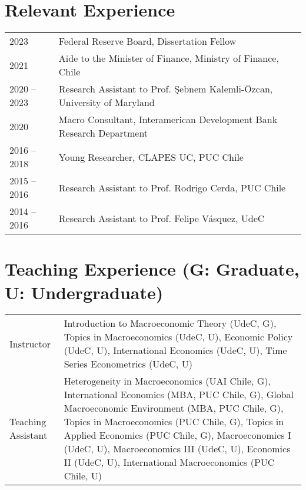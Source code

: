 \documentclass[10pt]{article}
\begin{document}



\section*{Relevant Experience}

\begin{tabular}{@{}p{1.8cm}p{13cm}}
    2023 & Federal Reserve Board, Dissertation Fellow\\
    2021 & Aide to the Minister of Finance, Ministry of Finance, Chile\\
    2020 -- 2023& Research Assistant to Prof. \c{S}ebnem Kalemli-\"{O}zcan, University of Maryland\\
    2020& Macro Consultant, Interamerican Development Bank Research Department\\
    2016 -- 2018& Young Researcher, CLAPES UC, PUC Chile\\
    2015 -- 2016& Research Assistant to Prof. Rodrigo Cerda, PUC Chile\\
    2014 -- 2016& Research Assistant to Prof. Felipe V\'asquez, UdeC
\end{tabular}




\section*{Teaching Experience (\footnotesize G: Graduate, U: Undergraduate)}
\begin{tabular}{@{}p{1.8cm}p{13cm}}
Instructor& Introduction to Macroeconomic Theory (UdeC, G), Topics in Macroeconomics (UdeC, U), Economic Policy (UdeC, U), International Economics (UdeC, U), Time Series Econometrics (UdeC, U)\\
Teaching Assistant& Heterogeneity in Macroeconomics (UAI Chile, G), International Economics (MBA, PUC Chile, G), Global Macroeconomic Environment (MBA, PUC Chile, G), Topics in Macroeconomics (PUC Chile, G), Topics in Applied Economics (PUC Chile, G), Macroeconomics I (UdeC, U), Macroeconomics III (UdeC, U), Economics II (UdeC, U), International Macroeconomics (PUC Chile, U)
\end{tabular}
\end{document}

